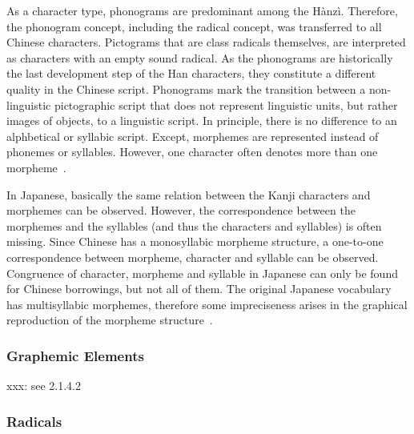 As a character type, phonograms are predominant among the Hànzì. Therefore, the
phonogram concept, including the radical concept, was transferred to all Chinese 
characters. Pictograms that are class radicals themselves, are interpreted as 
characters with an empty sound radical. As the phonograms are historically the 
last development step of the Han characters, they constitute a different quality 
in the Chinese script. Phonograms mark the transition between a non-linguistic
pictographic script that does not represent linguistic units, but rather images 
of objects, to a linguistic script. In principle, there is no difference to
an alphbetical or syllabic script. Except, morphemes are represented instead of 
phonemes or syllables. However, one character often denotes more than one 
morpheme~.

In Japanese, basically the same relation between the Kanji characters and 
morphemes can be observed. However, the correspondence between the morphemes and 
the syllables (and thus the characters and syllables) is often missing.
Since Chinese has a monosyllabic morpheme structure, a one-to-one correspondence
between morpheme, character and syllable can be observed.
Congruence of character, morpheme and syllable in Japanese can only be found for
Chinese borrowings, but not all of them. The original Japanese vocabulary has
multisyllabic morphemes, therefore some impreciseness arises in the graphical
reproduction of the morpheme structure~.

\subsubsection{Graphemic Elements}
\label{sec:graphemicelements}

xxx: see  2.1.4.2

\subsubsection{Radicals}
\label{sec:radicals}


